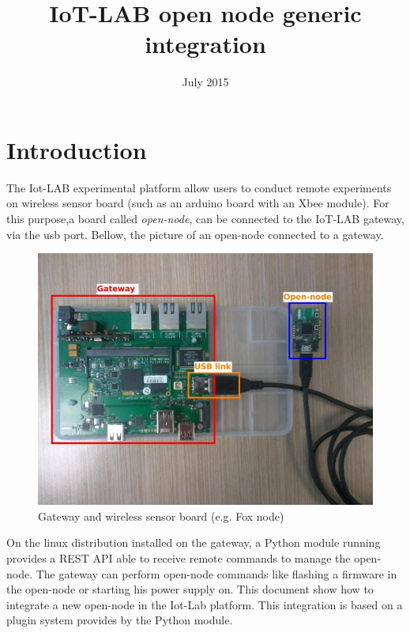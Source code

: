 \documentclass[12pt,a4paper,twoside]{article}
\title{IoT-LAB open node generic integration}
\author{ }
\date{July 2015}
\begin{document}
 

\maketitle

\section{Introduction}
The Iot-LAB experimental platform allow users to conduct remote experiments on wireless sensor board (such as an arduino board with an Xbee module).
For this purpose,a board called \textit{open-node}, can be connected to the IoT-LAB gateway, via the usb port.\newline
Bellow, the picture of an open-node connected to a gateway.\newline
\begin{figure}[H]
\centering
\includegraphics[scale=0.4]{gateway.jpg}
\caption{Gateway and wireless sensor board (e.g. Fox node)}
\label{fig1}
\end{figure}
On the linux distribution installed on the gateway, a Python module running provides a REST API able to receive remote commands to manage the open-node. The gateway can perform open-node commands like flashing a firmware in the open-node or starting his power supply on. \newline
This document show how to integrate a new open-node in the Iot-Lab platform.\newline
This integration is based on a plugin system provides by the Python module.
\end{document}
